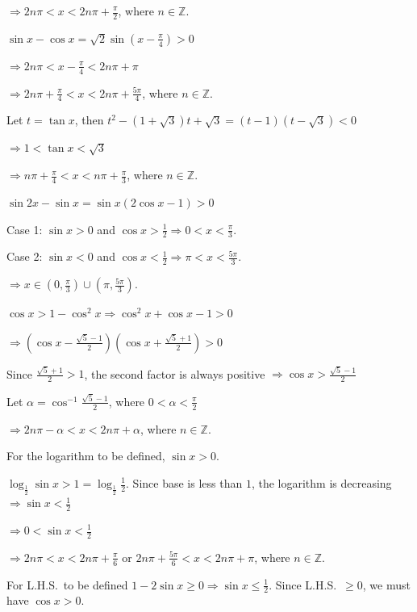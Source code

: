   $\Rightarrow 2n\pi < x < 2n\pi + \frac{\pi}{2}$, where $n\in\mathbb{Z}$.
\item $\sin x - \cos x = \sqrt{2}\sin\left(x - \frac{\pi}{4}\right) > 0$

  $\Rightarrow 2n\pi < x - \frac{\pi}{4} < 2n\pi + \pi$

  $\Rightarrow 2n\pi + \frac{\pi}{4} < x < 2n\pi + \frac{5\pi}{4}$, where $n\in\mathbb{Z}$.
\item Let $t = \tan x$, then $t^2 - (1 + \sqrt{3})t + \sqrt{3} = (t - 1)(t - \sqrt{3}) < 0$

  $\Rightarrow 1 < \tan x < \sqrt{3}$

  $\Rightarrow n\pi + \frac{\pi}{4} < x < n\pi + \frac{\pi}{3}$, where $n\in\mathbb{Z}$.
\item $\sin2x - \sin x = \sin x(2\cos x - 1) > 0$

  Case 1: $\sin x > 0$ and $\cos x > \frac{1}{2}\Rightarrow 0 < x < \frac{\pi}{3}$.

  Case 2: $\sin x < 0$ and $\cos x < \frac{1}{2}\Rightarrow \pi < x < \frac{5\pi}{3}$.

  $\Rightarrow x\in\left(0, \frac{\pi}{3}\right)\cup\left(\pi, \frac{5\pi}{3}\right)$.
\item $\cos x > 1 - \cos^2x\Rightarrow \cos^2x + \cos x - 1 > 0$

  $\Rightarrow \left(\cos x - \frac{\sqrt{5} - 1}{2}\right)\left(\cos x + \frac{\sqrt{5} + 1}{2}\right) > 0$

  Since $\frac{\sqrt{5} + 1}{2} > 1$, the second factor is always positive $\Rightarrow \cos x > \frac{\sqrt{5}
  - 1}{2}$

  Let $\alpha = \cos^{-1}\frac{\sqrt{5} - 1}{2}$, where $0 < \alpha < \frac{\pi}{2}$

  $\Rightarrow 2n\pi - \alpha < x < 2n\pi + \alpha$, where $n\in\mathbb{Z}$.
\item For the logarithm to be defined, $\sin x > 0$.

  $\log_{\frac{1}{2}}\sin x > 1 = \log_{\frac{1}{2}}\frac{1}{2}$. Since base is less than $1$, the logarithm
  is decreasing $\Rightarrow \sin x < \frac{1}{2}$

  $\Rightarrow 0 < \sin x < \frac{1}{2}$

  $\Rightarrow 2n\pi < x < 2n\pi + \frac{\pi}{6}$ or $2n\pi + \frac{5\pi}{6} < x < 2n\pi + \pi$, where
  $n\in\mathbb{Z}$.
\item For L.H.S.\ to be defined $1 - 2\sin x\geq 0\Rightarrow \sin x\leq \frac{1}{2}$. Since L.H.S.\ $\geq 0$,
  we must have $\cos x > 0$.

